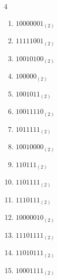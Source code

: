 \begin{multicols}{4}
\begin{enumerate}
        \phantom{$=101$}

  \item $10000001_{(2)}$

        \phantom{$=129$}

\columnbreak %

  \item $11111001_{(2)}$

        \phantom{$=249$}

  \item $10010100_{(2)}$

        \phantom{$=148$}

  \item $100000_{(2)}$

        \phantom{$=32$}

  \item $1001011_{(2)}$

        \phantom{$=75$}

  \item $10011110_{(2)}$

        \phantom{$=158$}

  \item $1011111_{(2)}$

        \phantom{$=95$}

  \item $10010000_{(2)}$

        \phantom{$=144$}

  \item $110111_{(2)}$

        \phantom{$=55$}

  \item $1101111_{(2)}$

        \phantom{$=111$}

  \item $1110111_{(2)}$

        \phantom{$=119$}

  \item $10000010_{(2)}$

        \phantom{$=130$}

  \item $11101111_{(2)}$

        \phantom{$=239$}

  \item $11010111_{(2)}$

        \phantom{$=215$}

  \item $10001111_{(2)}$


\end{enumerate}
\end{multicols}
